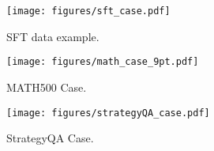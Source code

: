 \begin{figure*}[t]
	\centering
	\texttt{[image: figures/sft\_case.pdf]}
	\caption{SFT data example.}
	\label{fig:sft_case}
\end{figure*}

\begin{figure*}[t]
	\centering
	\texttt{[image: figures/math\_case\_9pt.pdf]}	
	\caption{MATH500 Case.}
	\label{fig:math_case}
\end{figure*}

\begin{figure*}[t]
	\centering
	\texttt{[image: figures/strategyQA\_case.pdf]}	
	\caption{StrategyQA Case.}
	\label{fig:sqa_case}
\end{figure*}
